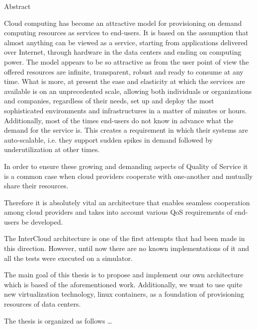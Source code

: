 \vspace*{0.5cm}

\begin{center}
  \LARGE Abstract
\end{center}

Cloud computing has become an attractive model for provisioning on demand
computing resources as services to end-users. It is based on the assumption
that almost anything can be viewed as a service, starting from applications
delivered over Internet, through hardware in the data centers and ending on
computing power. The model appears to be so attractive as from the user point
of view the offered resources are infinite, transparent, robust and ready to
consume at any time. What is more, at present the ease and elasticity at
which the services are available is on an unprecedented scale, allowing both
individuals or organizations and companies, regardless of their needs, set up
and deploy the most sophisticated environments and infrastructures in a
matter of minutes or hours. Additionally, most of the times end-users do not
know in advance what the demand for the service is. This creates a
requirement in which their systems are auto-scalable, i.e. they support
sudden spikes in demand followed by underutilization at other times.

In order to ensure these growing and demanding aspects of Quality of Service
it is a common case when cloud providers cooperate with one-another and
mutually share their resources.

Therefore it is absolutely vital an architecture that enables seamless
cooperation among cloud providers and takes into account various QoS
requirements of end-users be developed.

The InterCloud architecture is one of the first attempts that had been made
in this direction. However, until now there are no known implementations of
it and all the tests were executed on a simulator.

The main goal of this thesis is to propose and implement our own architecture
which is based of the aforementioned work. Additionally, we want to use quite
new virtualization technology, linux containers, as a foundation of
provisioning resources of data centers.

The thesis is organized as follows \ldots

